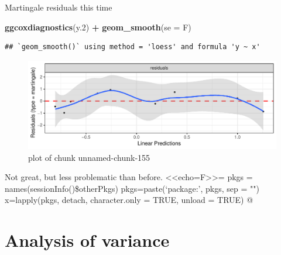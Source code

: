 \documentclass[ignorenonframetext,]{beamer}
\newenvironment{Shaded}{\begin{snugshade}}{\end{snugshade}}
\newcommand{\DataTypeTok}[1]{\textcolor[rgb]{0.13,0.29,0.53}{#1}}
\newcommand{\FloatTok}[1]{\textcolor[rgb]{0.00,0.00,0.81}{#1}}
\newcommand{\KeywordTok}[1]{\textcolor[rgb]{0.13,0.29,0.53}{\textbf{#1}}}
\newcommand{\NormalTok}[1]{#1}
\newcommand{\OperatorTok}[1]{\textcolor[rgb]{0.81,0.36,0.00}{\textbf{#1}}}
\newcommand{\StringTok}[1]{\textcolor[rgb]{0.31,0.60,0.02}{#1}}
\begin{document}
\begin{frame}[fragile]{Martingale residuals this time}
\protect\hypertarget{martingale-residuals-this-time}{}

\begin{Shaded}
\begin{Highlighting}[]
\KeywordTok{ggcoxdiagnostics}\NormalTok{(y}\FloatTok{.2}\NormalTok{) }\OperatorTok{+}\StringTok{ }\KeywordTok{geom_smooth}\NormalTok{(}\DataTypeTok{se =}\NormalTok{ F)}
\end{Highlighting}
\end{Shaded}

\begin{verbatim}
## `geom_smooth()` using method = 'loess' and formula 'y ~ x'
\end{verbatim}

\begin{figure}
\centering
\includegraphics{figure/unnamed-chunk-155-1.pdf}
\caption{plot of chunk unnamed-chunk-155}
\end{figure}

Not great, but less problematic than before.
\textless{}\textless{}echo=F\textgreater{}\textgreater{}= pkgs =
names(sessionInfo()\$otherPkgs) pkgs=paste(`package:', pkgs, sep = "")
x=lapply(pkgs, detach, character.only = TRUE, unload = TRUE) @

\section{Analysis of variance}
\frame{\sectionpage}

\end{frame}
\end{document}
